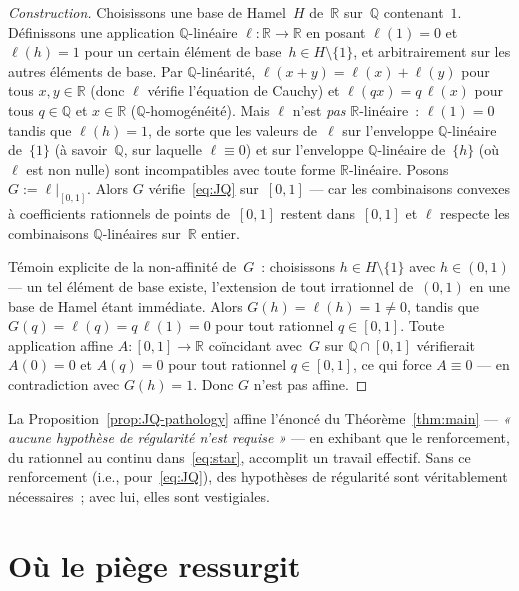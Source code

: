 \documentclass[11pt,a4paper]{amsart}
\newcommand{\R}{\mathbb R}
\newcommand{\Q}{\mathbb Q}
\begin{document}
\begin{proof}[Construction]
Choisissons une base de Hamel~$H$ de~$\R$ sur~$\Q$ contenant~$1$.
Définissons une application $\Q$-linéaire $\ell\colon\R \to \R$ en posant
$\ell(1) = 0$ et $\ell(h) = 1$ pour un certain élément de
base~$h \in H \setminus \{1\}$, et arbitrairement sur les autres éléments
de base. Par $\Q$-linéarité, $\ell(x + y) = \ell(x) + \ell(y)$ pour tous
$x, y \in \R$ (donc $\ell$ vérifie l'équation de Cauchy) et
$\ell(qx) = q\,\ell(x)$ pour tous $q \in \Q$ et $x \in \R$
($\Q$-homogénéité). Mais $\ell$ n'est \emph{pas} $\R$-linéaire~:
$\ell(1) = 0$ tandis que $\ell(h) = 1$, de sorte que les valeurs de~$\ell$
sur l'enveloppe $\Q$-linéaire de~$\{1\}$ (à savoir~$\Q$, sur laquelle
$\ell \equiv 0$) et sur l'enveloppe $\Q$-linéaire de~$\{h\}$ (où $\ell$
est non nulle) sont incompatibles avec toute forme $\R$-linéaire. Posons
$G := \ell|_{[0, 1]}$. Alors $G$ vérifie~\eqref{eq:JQ} sur~$[0, 1]$ ---
car les combinaisons convexes à coefficients rationnels de points
de~$[0, 1]$ restent dans~$[0, 1]$ et $\ell$ respecte les combinaisons
$\Q$-linéaires sur~$\R$ entier.

Témoin explicite de la non-affinité de~$G$~: choisissons
$h \in H \setminus \{1\}$ avec $h \in (0, 1)$ --- un tel élément de base
existe, l'extension de tout irrationnel de~$(0, 1)$ en une base de Hamel
étant immédiate. Alors $G(h) = \ell(h) = 1 \neq 0$, tandis que
$G(q) = \ell(q) = q\,\ell(1) = 0$ pour tout rationnel $q \in [0, 1]$.
Toute application affine $A\colon[0, 1] \to \R$ coïncidant avec~$G$ sur
$\Q \cap [0, 1]$ vérifierait $A(0) = 0$ et $A(q) = 0$ pour tout rationnel
$q \in [0, 1]$, ce qui force $A \equiv 0$ --- en contradiction avec
$G(h) = 1$. Donc $G$ n'est pas affine.
\end{proof}

La Proposition~\ref{prop:JQ-pathology} affine l'énoncé du
Théorème~\ref{thm:main} --- \emph{« aucune hypothèse de régularité n'est
requise »} --- en exhibant que le renforcement, du rationnel au continu
dans~\eqref{eq:star}, accomplit un travail effectif. Sans ce renforcement
(i.e., pour~\eqref{eq:JQ}), des hypothèses de régularité sont véritablement
nécessaires~; avec lui, elles sont vestigiales.

\section{Où le piège ressurgit}
\label{sec:recurrence}
\end{document}
